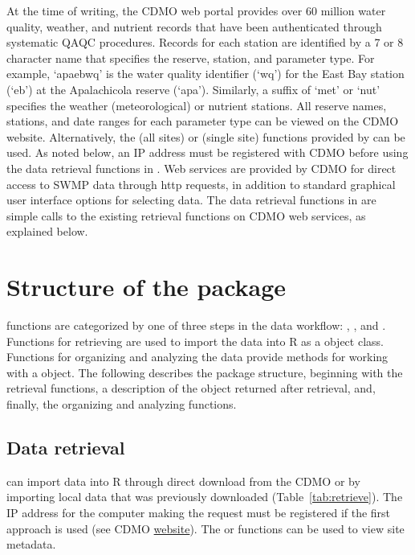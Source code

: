 At the time of writing, the CDMO web portal provides over 60 million water quality, weather, and nutrient records that have been authenticated through systematic QAQC procedures.  Records for each station are identified by a 7 or 8 character name that specifies the reserve, station, and parameter type.  For example, `apaebwq' is the water quality identifier (`wq') for the East Bay station (`eb') at the Apalachicola reserve (`apa').  Similarly, a suffix of `met' or `nut' specifies the weather (meteorological) or nutrient stations.  All reserve names, stations, and date ranges for each parameter type can be viewed on the CDMO website. Alternatively, the  (all sites) or  (single site) functions provided by  can be used.  As noted below, an IP address must be registered with CDMO before using the data retrieval functions in .  Web services are provided by CDMO for direct access to SWMP data through http requests, in addition to standard graphical user interface options for selecting data.  The data retrieval functions in  are simple calls to the existing retrieval functions on CDMO web services, as explained below.

\section{Structure of the  package}



 functions are categorized by one of three steps in the data workflow: , , and .  Functions for retrieving are used to import the data into R as a  object class.  Functions for organizing and analyzing the data provide methods for working with a  object.  The following describes the package structure, beginning with the retrieval functions, a description of the  object returned after retrieval, and, finally, the organizing and analyzing functions.

\subsection{Data retrieval}

 can import data into R through direct download from the CDMO or by importing local data that was previously downloaded (Table~\ref{tab:retrieve}). The IP address for the computer making the request must be registered if the first approach is used (see CDMO \href{http://cdmo.baruch.sc.edu/data/qaqc.cfm}{website}).  The  or  functions can be used to view site metadata. 

